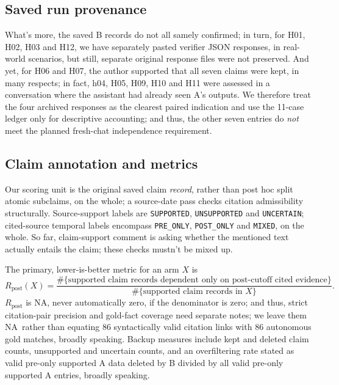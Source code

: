 \documentclass[12pt,a4paper]{article}
\newcommand{\NA}{\textsc{NA}}
\begin{document}
\subsection{Saved run provenance}
What's more, the saved B records do not all samely confirmed; in turn, for H01, H02, H03 and H12, we have separately pasted verifier JSON responses, in real-world scenarios, but still, separate original response files were not preserved. And yet, for H06 and H07, the author supported that all seven claims were kept, in many respects; in fact, h04, H05, H09, H10 and H11 were assessed in a conversation where the assistant had already seen A's outputs. We therefore treat the four archived responses as the clearest paired indication and use the 11-case ledger only for descriptive accounting; and thus, the other seven entries do \emph{not} meet the planned fresh-chat independence requirement.

\subsection{Claim annotation and metrics}
Our scoring unit is the original saved claim \emph{record}, rather than post hoc split atomic subclaims, on the whole; a source-date pass checks citation admissibility structurally. Source-support labels are \texttt{SUPPORTED}, \texttt{UNSUPPORTED} and \texttt{UNCERTAIN}; cited-source temporal labels encompass \texttt{PRE\_ONLY}, \texttt{POST\_ONLY} and \texttt{MIXED}, on the whole. So far, claim-support comment is asking whether the mentioned text actually entails the claim; these checks mustn't be mixed up.

The primary, lower-is-better metric for an arm $X$ is
\begin{equation}
 R_{\mathrm{post}}(X)=\frac{\#\{\text{supported claim records dependent only on post-cutoff cited evidence}\}}{\#\{\text{supported claim records in }X\}}.
\label{eq:main}
\end{equation}
$R_{\mathrm{post}}$ is \NA, never automatically zero, if the denominator is zero; and thus, strict citation-pair precision and gold-fact coverage need separate notes; we leave them \NA\ rather than equating 86 syntactically valid citation links with 86 autonomous gold matches, broadly speaking. Backup measures include kept and deleted claim counts, unsupported and uncertain counts, and an overfiltering rate stated as valid pre-only supported A data deleted by B divided by all valid pre-only supported A entries, broadly speaking.
\end{document}
